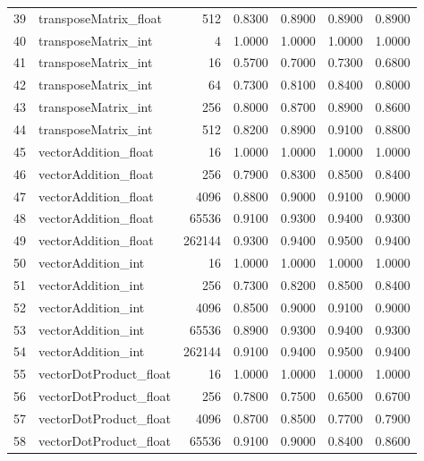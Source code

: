 \begin{tabular}{rlrrrrr}
 39 & transposeMatrix\_float  &    512 &   0.8300 &     0.8900 &   0.8900 &     0.8900 \\
 40 & transposeMatrix\_int    &      4 &   1.0000 &     1.0000 &   1.0000 &     1.0000 \\
 41 & transposeMatrix\_int    &     16 &   0.5700 &     0.7000 &   0.7300 &     0.6800 \\
 42 & transposeMatrix\_int    &     64 &   0.7300 &     0.8100 &   0.8400 &     0.8000 \\
 43 & transposeMatrix\_int    &    256 &   0.8000 &     0.8700 &   0.8900 &     0.8600 \\
 44 & transposeMatrix\_int    &    512 &   0.8200 &     0.8900 &   0.9100 &     0.8800 \\
 45 & vectorAddition\_float   &     16 &   1.0000 &     1.0000 &   1.0000 &     1.0000 \\
 46 & vectorAddition\_float   &    256 &   0.7900 &     0.8300 &   0.8500 &     0.8400 \\
 47 & vectorAddition\_float   &   4096 &   0.8800 &     0.9000 &   0.9100 &     0.9000 \\
 48 & vectorAddition\_float   &  65536 &   0.9100 &     0.9300 &   0.9400 &     0.9300 \\
 49 & vectorAddition\_float   & 262144 &   0.9300 &     0.9400 &   0.9500 &     0.9400 \\
 50 & vectorAddition\_int     &     16 &   1.0000 &     1.0000 &   1.0000 &     1.0000 \\
 51 & vectorAddition\_int     &    256 &   0.7300 &     0.8200 &   0.8500 &     0.8400 \\
 52 & vectorAddition\_int     &   4096 &   0.8500 &     0.9000 &   0.9100 &     0.9000 \\
 53 & vectorAddition\_int     &  65536 &   0.8900 &     0.9300 &   0.9400 &     0.9300 \\
 54 & vectorAddition\_int     & 262144 &   0.9100 &     0.9400 &   0.9500 &     0.9400 \\
 55 & vectorDotProduct\_float &     16 &   1.0000 &     1.0000 &   1.0000 &     1.0000 \\
 56 & vectorDotProduct\_float &    256 &   0.7800 &     0.7500 &   0.6500 &     0.6700 \\
 57 & vectorDotProduct\_float &   4096 &   0.8700 &     0.8500 &   0.7700 &     0.7900 \\
 58 & vectorDotProduct\_float &  65536 &   0.9100 &     0.9000 &   0.8400 &     0.8600 \\

\end{tabular}
